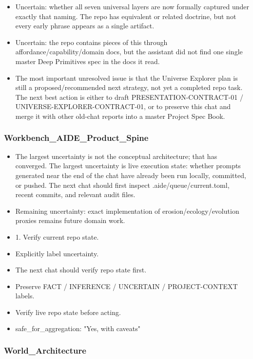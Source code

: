\documentclass[11pt,a4paper]{report}
\begin{document}
\begin{itemize}
\item Uncertain: whether all seven universal layers are now formally captured under exactly that naming. The repo has equivalent or related doctrine, but not every early phrase appears as a single artifact.
\item Uncertain: the repo contains pieces of this through affordance/capability/domain docs, but the assistant did not find one single master Deep Primitives spec in the docs it read.
\item The most important unresolved issue is that the Universe Explorer plan is still a proposed/recommended next strategy, not yet a completed repo task. The next best action is either to draft PRESENTATION-CONTRACT-01 / UNIVERSE-EXPLORER-CONTRACT-01, or to preserve this chat and merge it with other old-chat reports into a master Project Spec Book.
\end{itemize}

\subsubsection{Workbench\_AIDE\_Product\_Spine}

\begin{itemize}
\item The largest uncertainty is not the conceptual architecture; that has converged. The largest uncertainty is live execution state: whether prompts generated near the end of the chat have already been run locally, committed, or pushed. The next chat should first inspect .aide/queue/current.toml, recent commits, and relevant audit files.
\item Remaining uncertainty: exact implementation of erosion/ecology/evolution proxies remains future domain work.
\item 1. Verify current repo state.
\item Explicitly label uncertainty.
\item The next chat should verify repo state first.
\item Preserve FACT / INFERENCE / UNCERTAIN / PROJECT-CONTEXT labels.
\item Verify live repo state before acting.
\item safe\_for\_aggregation: "Yes, with caveats"
\end{itemize}

\subsubsection{World\_Architecture}
\end{document}
